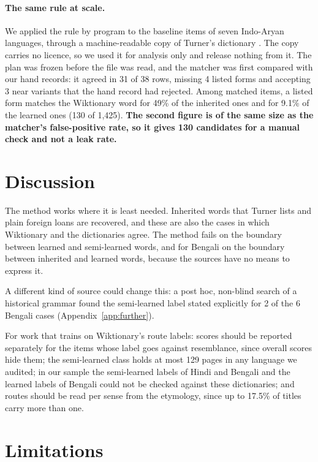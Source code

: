 \documentclass[11pt]{article}
\begin{document}
\paragraph{The same rule at scale.} We applied the rule by program to the baseline items of seven Indo-Aryan languages, through a machine-readable copy of Turner's dictionary \citep{arora2023jambu}. The copy carries no licence, so we used it for analysis only and release nothing from it. The plan was frozen before the file was read, and the matcher was first compared with our hand records: it agreed in 31 of 38 rows, missing 4 listed forms and accepting 3 near variants that the hand record had rejected. Among matched items, a listed form matches the Wiktionary word for 49\% of the inherited ones and for 9.1\% of the learned ones (130 of 1,425). \textbf{The second figure is of the same size as the matcher's false-positive rate, so it gives 130 candidates for a manual check and not a leak rate.}

\section{Discussion}

The method works where it is least needed. Inherited words that Turner lists and plain foreign loans are recovered, and these are also the cases in which Wiktionary and the dictionaries agree. The method fails on the boundary between learned and semi-learned words, and for Bengali on the boundary between inherited and learned words, because the sources have no means to express it.

A different kind of source could change this: a post hoc, non-blind search of a historical grammar found the semi-learned label stated explicitly for 2 of the 6 Bengali cases (Appendix~\ref{app:further}).

For work that trains on Wiktionary's route labels: scores should be reported separately for the items whose label goes against resemblance, since overall scores hide them; the semi-learned class holds at most 129 pages in any language we audited; in our sample the semi-learned labels of Hindi and Bengali and the learned labels of Bengali could not be checked against these dictionaries; and routes should be read per sense from the etymology, since up to 17.5\% of titles carry more than one.

\section*{Limitations}
\end{document}
